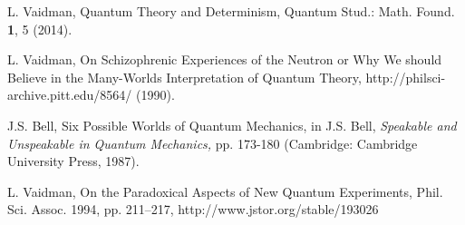 \documentclass[12pt]{article}
\begin{document}
\begin{thebibliography}{99}
L. Vaidman,
Quantum Theory and Determinism,
Quantum Stud.: Math. Found. {\bf 1}, 5 (2014).

L. Vaidman,
 On Schizophrenic Experiences of the Neutron or Why We should Believe in the Many-Worlds Interpretation of Quantum Theory,
  http://philsci-archive.pitt.edu/8564/ (1990).


J.S. Bell,
 Six Possible Worlds of Quantum Mechanics,
 in J.S. Bell, {\it Speakable and Unspeakable in Quantum Mechanics,} pp. 173-180 (Cambridge: Cambridge University
Press, 1987).

L. Vaidman,   On the Paradoxical Aspects of New Quantum Experiments, Phil.  Sci.  Assoc. 1994, pp. 211–217, http://www.jstor.org/stable/193026



\end{thebibliography}
\end{document}

